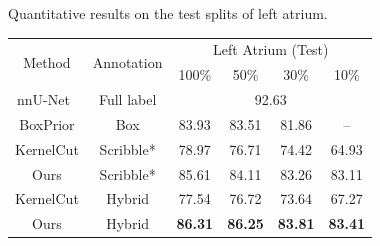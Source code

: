     \begin{table}[t!]
        \centering    
        {Quantitative results on the test splits of left atrium.}
            \begin{tabular}{c|c|c c c c }
                \toprule
                \multirow{2}{*}{Method} & \multirow{2}{*}{Annotation} & \multicolumn{4}{c}{Left Atrium (Test)}  \\ 
                &                        & 100\% & 50\% & 30\% & 10\%                             \\ \midrule
                nnU-Net~\cite{isensee2019automated}     & Full label        & \multicolumn{4}{c}{92.63}          \\ \cmidrule{1-6}
                BoxPrior\cite{kervadec2020bounding}    & Box  & 83.93  & 83.51  & 81.86 & --    \\
                KernelCut\cite{tang2018regularized}   & Scribble* & 78.97  & 76.71  & 74.42  & 64.93  \\
                Ours & Scribble* & 85.61 & 84.11 & 83.26 & 83.11  \\
                KernelCut\cite{tang2018regularized}   & Hybrid & 77.54	& 76.72	& 73.64	& 67.27             \\
                Ours        & Hybrid    & \textbf{86.31} & \textbf{86.25} & \textbf{83.81} & \textbf{83.41}                           \\
                \bottomrule
            \end{tabular}
        \label{tab:test_res2}
    \end{table}


